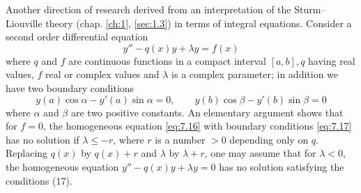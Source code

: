 \documentclass[12pt,a4paper,leqno,twoside]{extbook}
\begin{document}
Another direction of research derived from an interpretation of the Sturm--Liouville theory (chap. \ref{ch:1}, \ref{sec:1.3}) in terms of integral equations. Consider a second order differential equation
\begin{equation}
    \label{eq:7.16}
    y'' - q(x)y + \lambda y = f(x)
\end{equation}
where \(q\) and \(f\) are continuous functions in a compact interval \([a,b], q\) having real values, \(f\) real or complex values and \(\lambda\) is a complex parameter; in addition we have two boundary conditions
\begin{equation}
    \label{eq:7.17}
    y(a)\cos\alpha - y'(a)\sin\alpha = 0, \qquad y(b)\cos\beta - y'(b)\sin\beta = 0
\end{equation}
where \(\alpha\) and \(\beta\) are two positive constants. An elementary argument shows that for \(f = 0\), the homogeneous equation \eqref{eq:7.16} with boundary conditions \eqref{eq:7.17} has no solution if \(\lambda \leq -r\), where \(r\) is a number \(>0\) depending only on \(q\). Replacing \(q(x)\) by \(q(x) + r\) and \(\lambda\) by \(\lambda + r\), one may assume that for \(\lambda < 0\), the homogeneous equation \(y'' - q(x)y + \lambda y = 0\) has no solution satisfying the conditions (17).
\end{document}
